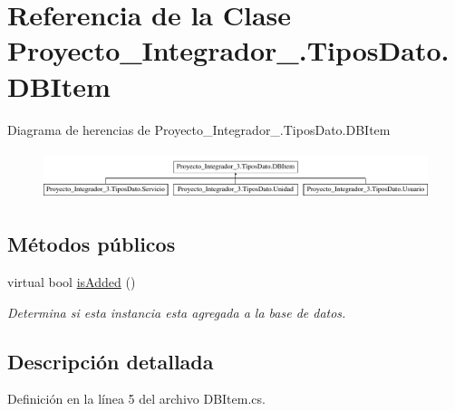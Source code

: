 \hypertarget{class_proyecto___integrador__3_1_1_tipos_dato_1_1_d_b_item}{\section{Referencia de la Clase Proyecto\-\_\-\-Integrador\-\_.\-Tipos\-Dato.\-D\-B\-Item}
\label{class_proyecto___integrador__3_1_1_tipos_dato_1_1_d_b_item}
}
Diagrama de herencias de Proyecto\-\_\-\-Integrador\-\_.\-Tipos\-Dato.\-D\-B\-Item\begin{figure}[H]
\begin{center}
\leavevmode
\includegraphics[height=1.430396cm]{db/d99/class_proyecto___integrador__3_1_1_tipos_dato_1_1_d_b_item}
\end{center}
\end{figure}
\subsection*{Métodos públicos}
\begin{DoxyCompactItemize}
\item 
virtual bool \hyperlink{class_proyecto___integrador__3_1_1_tipos_dato_1_1_d_b_item_ab88d7eef0fa58d7d5fdf40039867dd6e}{is\-Added} ()
\begin{DoxyCompactList}\small\item\em Determina si esta instancia esta agregada a la base de datos. \end{DoxyCompactList}\end{DoxyCompactItemize}


\subsection{Descripción detallada}


Definición en la línea 5 del archivo D\-B\-Item.\-cs.



